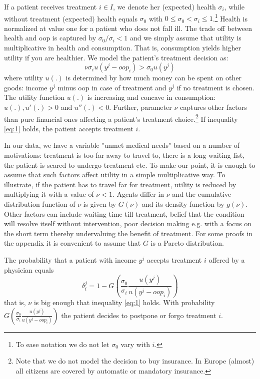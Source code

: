 \documentclass[a4paper,12pt]{article}
\begin{document}
If a patient receives treatment \(i \in I\), we denote her (expected) health \(\sigma_i\), while without treatment (expected) health equals \(\sigma_0\) with \(0 \leq \sigma_0 < \sigma_i \leq 1\).\footnote{To ease notation we do not let \(\sigma_0\) vary with \(i\).} Health is normalized at value one for a patient who does not fall ill. The trade off between health and oop is captured by \(\sigma_0/\sigma_i <1\) and we simply assume that utility is multiplicative in health and consumption. That is, consumption yields higher utility if you are healthier. We model the patient's treatment decision as:
\begin{equation}
\label{eq:1}
\nu \sigma_i u(y^j-oop_i) > \sigma_0 u(y^j)
\end{equation}
where utility \(u(.)\) is determined by how much money can be spent on other goods: income \(y^j\) minus oop in case of treatment and \(y^j\) if no treatment is chosen. The utility function \(u(.)\) is increasing and concave in consumption: \(u(.), u'(.) >0\) and \(u''(.) < 0\). Further, parameter \(\nu\) captures other factors than pure financial ones affecting a patient's treatment choice.\footnote{Note that we do not model the decision to buy insurance. In Europe (almost) all citizens are covered by automatic or mandatory insurance.} If inequality \eqref{eq:1} holds, the patient accepts treatment \(i\).

In our data, we have a variable "unmet medical needs" based on a number of motivations: treatment is too far away to travel to, there is a long waiting list, the patient is scared to undergo treatment etc. To make our point, it is enough to assume that such factors affect utility in a simple multiplicative way. To illustrate, if the patient has to travel far for treatment, utility is reduced by multiplying it with a value of \(\nu < 1\). Agents differ in \(\nu\) and the cumulative distribution function of \(\nu\) is given by \(G(\nu)\) and its density function by \(g(\nu)\). Other factors can include waiting time till treatment, belief that the condition will resolve itself without intervention, poor decision making e.g. with a focus on the short term thereby undervaluing the benefit of treatment. For some proofs in the appendix it is convenient to assume that \(G\) is a Pareto distribution.

The probability that a patient with income \(y^{j}\) accepts treatment \(i\) offered by a physician equals
\begin{equation}
\label{eq:2}
\delta_i^j = 1-G\left( \frac{\sigma_0}{\sigma_i} \frac{u(y^{j})}{u(y^{j}-oop_i)} \right)
\end{equation}
that is, \(\nu\) is big enough that inequality \eqref{eq:1} holds. With probability \(G\left( \frac{\sigma_0}{\sigma_i} \frac{u(y^{j})}{u(y^{j}-oop_i)} \right)\) the patient decides to postpone or forgo treatment \(i\).
\end{document}
